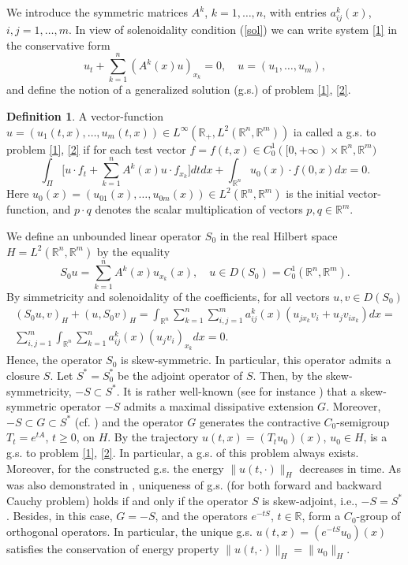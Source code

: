 \documentclass[12pt]{article}
\theoremstyle{plain}
\theoremstyle{definition}
\newtheorem{definition}{Definition}[section]
\numberwithin{equation}{section}
\newcommand{\R}{{\mathbb R}}
\begin{document}
We introduce the symmetric matrices $A^k$, $k=1,\ldots,n$, with entries $a^k_{ij}(x)$, $i,j=1,\ldots,m$. In view of solenoidality condition (\ref{sol}) we can write system \eqref{1} in the conservative form
$$
u_t+\sum_{k=1}^n (A^k(x)u)_{x_k}=0, \quad u=(u_1,\ldots,u_m),
$$
and define the notion of a generalized solution (g.s.) of problem \eqref{1}, \eqref{2}.

\begin{definition}\label{def1}
A vector-function  $u=(u_1(t,x),\ldots,u_m(t,x))\in L^\infty(\R_+,L^2(\R^n,\R^m))$ ia called a g.s. to problem \eqref{1}, \eqref{2} if for each test vector $f=f(t,x)\in C_0^1([0,+\infty)\times\R^n,\R^m)$
\[
\int_{\Pi} \bigl[u\cdot f_t+\sum_{k=1}^n A^k(x)u\cdot f_{x_k}\bigr]dtdx+ \int_{\R^n}u_0(x)\cdot f(0,x)dx=0.
\]
Here $u_0(x)=(u_{01}(x),\ldots,u_{0m}(x))\in L^2(\R^n,\R^m)$ is the initial vector-function, and $p\cdot q$ denotes the scalar multiplication of vectors $p,q\in\R^m$.
\end{definition}

We define an unbounded linear operator $S_0$ in the real Hilbert space $H=L^2(\R^n,\R^m)$ by the equality
\[S_0u=\sum_{k=1}^n A^k(x)u_{x_k}(x), \quad u\in D(S_0)=C_0^1(\R^n,\R^m).\]
By simmetricity and solenoidality of the coefficients, for all vectors $u,v\in D(S_0)$
\begin{align*}
(S_0u,v)_H+(u,S_0v)_H=\int_{\mathbb{R}^n}\sum_{k=1}^n\sum_{i,j=1}^m a^k_{ij}(x)(u_{jx_k}v_i+u_j v_{ix_k})dx= \\
\sum_{i,j=1}^m\int_{\R^n}\sum_{k=1}^n a^k_{ij}(x)(u_jv_i)_{x_k}dx=0.
\end{align*}
Hence, the operator $S_0$ is skew-symmetric. In particular, this operator admits a closure $S$. Let $S^*=S_0^*$ be the adjoint operator of $S$. Then, by the skew-symmetricity, $-S\subset S^*$. It is rather well-known (see for instance \cite{Phil,Kr}) that a skew-symmetric operator $-S$ admits a maximal dissipative extension $G$. Moreover, $-S\subset G\subset S^*$ (cf. \cite[Lemma 1.1.5]{Phil}) and the operator $G$ generates the contractive $C_0$-semigroup $T_t=e^{tA}$, $t\ge 0$, on $H$. By \cite[Theorem~2.1]{Zap} the trajectory $u(t,x)=(T_tu_0)(x)$, $u_0\in H$, is a g.s. to problem \eqref{1}, \eqref{2}. In particular, a g.s. of this problem always exists. Moreover, for the constructed g.s. the energy $\|u(t,\cdot)\|_H$ decreases in time. As was also demonstrated in \cite[Corollary~3.1]{Zap}, uniqueness of g.s. (for both forward and backward Cauchy problem)
holds if and only if the operator $S$ is skew-adjoint, i.e., $-S=S^*$. Besides, in this case, $G=-S$, and the operators $e^{-tS}$, $t\in\R$, form a $C_0$-group of orthogonal operators. In particular, the unique g.s. $u(t,x)=(e^{-tS}u_0)(x)$ satisfies the conservation of energy property $\|u(t,\cdot)\|_H=\|u_0\|_H$.
\end{document}
